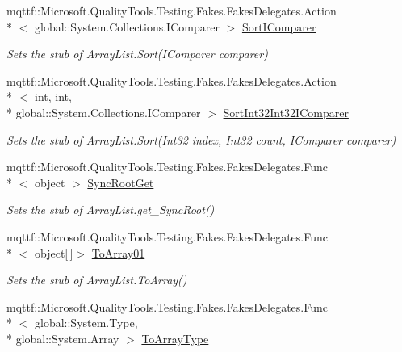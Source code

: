 \begin{DoxyCompactItemize}
mqttf\-::\-Microsoft.\-Quality\-Tools.\-Testing.\-Fakes.\-Fakes\-Delegates.\-Action\\*
$<$ global\-::\-System.\-Collections.\-I\-Comparer $>$ \hyperlink{class_system_1_1_collections_1_1_fakes_1_1_stub_array_list_a8a7855319b37c9131d03d34dbbc74020}{Sort\-I\-Comparer}
\begin{DoxyCompactList}\small\item\em Sets the stub of Array\-List.\-Sort(\-I\-Comparer comparer)\end{DoxyCompactList}\item 
mqttf\-::\-Microsoft.\-Quality\-Tools.\-Testing.\-Fakes.\-Fakes\-Delegates.\-Action\\*
$<$ int, int, \\*
global\-::\-System.\-Collections.\-I\-Comparer $>$ \hyperlink{class_system_1_1_collections_1_1_fakes_1_1_stub_array_list_a7ea171340540ebd8cad498c599f16ec9}{Sort\-Int32\-Int32\-I\-Comparer}
\begin{DoxyCompactList}\small\item\em Sets the stub of Array\-List.\-Sort(\-Int32 index, Int32 count, I\-Comparer comparer)\end{DoxyCompactList}\item 
mqttf\-::\-Microsoft.\-Quality\-Tools.\-Testing.\-Fakes.\-Fakes\-Delegates.\-Func\\*
$<$ object $>$ \hyperlink{class_system_1_1_collections_1_1_fakes_1_1_stub_array_list_a69b8739f0bdd80985a9b6eabd9c773ba}{Sync\-Root\-Get}
\begin{DoxyCompactList}\small\item\em Sets the stub of Array\-List.\-get\-\_\-\-Sync\-Root()\end{DoxyCompactList}\item 
mqttf\-::\-Microsoft.\-Quality\-Tools.\-Testing.\-Fakes.\-Fakes\-Delegates.\-Func\\*
$<$ object\mbox{[}$\,$\mbox{]}$>$ \hyperlink{class_system_1_1_collections_1_1_fakes_1_1_stub_array_list_afae1b7eb7e1ab266ab7770a577ae4efa}{To\-Array01}
\begin{DoxyCompactList}\small\item\em Sets the stub of Array\-List.\-To\-Array()\end{DoxyCompactList}\item 
mqttf\-::\-Microsoft.\-Quality\-Tools.\-Testing.\-Fakes.\-Fakes\-Delegates.\-Func\\*
$<$ global\-::\-System.\-Type, \\*
global\-::\-System.\-Array $>$ \hyperlink{class_system_1_1_collections_1_1_fakes_1_1_stub_array_list_a77291cfa69a983b7a811e4872d644d57}{To\-Array\-Type}

\end{DoxyCompactItemize}
